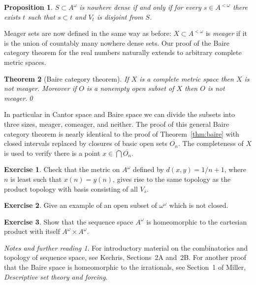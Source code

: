\documentclass[11pt,oneside]{amsbook}
\theoremstyle{definition}
\newtheorem{exerc}{Exercise}[section]
\theoremstyle{plain}
\newtheorem{theorem}{Theorem}[section]
\newtheorem{proposition}[theorem]{Proposition}
\theoremstyle{definition}
\theoremstyle{remark}
\newtheorem*{notes}{Notes and further reading}
\numberwithin{equation}{section}
\numberwithin{figure}{section}
\begin{document}
\begin{proposition}
  \label{prop:cantor-space-nwd}
  $S\subset A^\omega$ is nowhere dense if and only if for every $s\in A^{<\omega}$ there exists $t$ such that $s\subset t$ and $V_t$ is disjoint from $S$.
\end{proposition}

Meager sets are now defined in the same way as before: $X\subset A^{<\omega}$ is \emph{meager} if it is the union of countably many nowhere dense sets. Our proof of the Baire category theorem for the real numbers naturally extends to arbitrary complete metric spaces.

\begin{theorem}[Baire category theorem]
  If $X$ is a complete metric space then $X$ is not meager. Moreover if $O$ is a nonempty open subset of $X$ then $O$ is not meager.\qed
\end{theorem}

In particular in Cantor space and Baire space we can divide the subsets into three sizes, meager, comeager, and neither. The proof of this general Baire category theorem is nearly identical to the proof of Theorem~\ref{thm:baire} with closed intervals replaced by closures of basic open sets $\overline{O_n}$. The completeness of $X$ is used to verify there is a point $x\in\bigcap\overline{O_n}$.


\begin{exerc}
  Check that the metric on $A^\omega$ defined by $d(x,y)=1/{n+1}$, where $n$ is least such that $x(n)=y(n)$, gives rise to the same topology as the product topology with basis consisting of all $V_s$.
\end{exerc}

\begin{exerc}
  Give an example of an open subset of $\omega^\omega$ which is not closed.
\end{exerc}

\begin{exerc}
  Show that the sequence space $A^\omega$ is homeomorphic to the cartesian product with itself $A^\omega\times A^\omega$.
\end{exerc}

\begin{notes}
  For introductory material on the combinatorics and topology of sequence space, see Kechris, Sections~2A and~2B. For another proof that the Baire space is homeomorphic to the irrationals, see Section~1 of Miller, \emph{Descriptive set theory and forcing}.
\end{notes}
\end{document}
